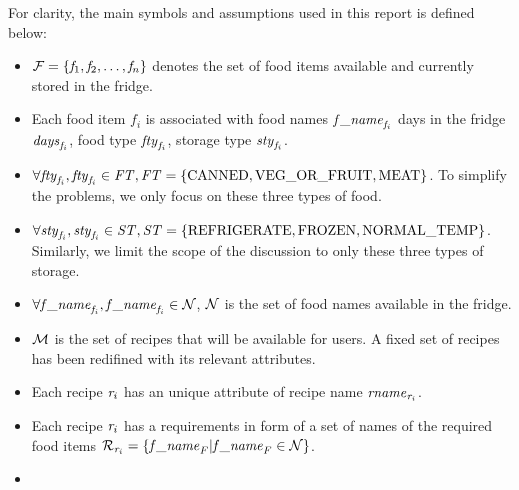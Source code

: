 For clarity, the main symbols and assumptions used in this report is defined below:

\begin{itemize}
    \item $\mathcal{F} = \{ \mathit{f}_1, \mathit{f}_2, \dots, \mathit{f}_n\}$ denotes the set of food items available and currently stored in the fridge.
    \item Each food item $f_i$ is associated with food names $\mathit{f\_name}_{\mathit{f}_i}$ days in the fridge $\mathit{days}_{\mathit{f}_i}$, food type $\mathit{fty}_{\mathit{f}_i}$, storage type $\mathit{sty}_{\mathit{f}_i}$.
    \item $\forall \mathit{fty}_{\mathit{f}_i}, \mathit{fty}_{\mathit{f}_i}\in \mathit{FT}, \mathit{FT} = \{ \text{CANNED}, \text{VEG\_OR\_FRUIT}, \text{MEAT} \}$. To simplify the problems, we only focus on these three types of food.
    \item $\forall \mathit{sty}_{\mathit{f}_i}, \mathit{sty}_{\mathit{f}_i}\in \mathit{ST}, \mathit{ST} = \{ \text{REFRIGERATE}, \text{FROZEN}, \text{NORMAL\_TEMP} \}$. Similarly, we limit the scope of the discussion to only these three types of storage.
    \item $\forall \mathit{f\_name}_{\mathit{f}_i}, \mathit{f\_name}_{\mathit{f}_i} \in \mathcal{N}$, $\mathcal{N}$ is the set of food names available in the fridge.
    \item $\mathcal{M}$ is the set of recipes that will be available for users. A fixed set of recipes has been redifined with its relevant attributes.
    \item Each recipe $\mathit{r}_i$ has an unique attribute of recipe name $\mathit{rname}_{\mathit{r}_i}$.
    \item Each recipe $\mathit{r}_i$ has a requirements in form of a set of names of the required food items $\mathcal{R}_{\mathit{r}_i} = \{ \mathit{f\_name}_{F} | \mathit{f\_name}_{F} \in \mathcal{N} \}$.
    \item 
\end{itemize}